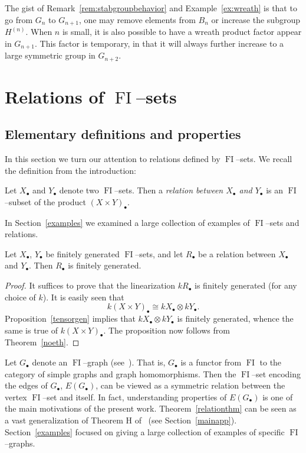 \documentclass[ALCO,ThmDefs,Unicode,epreuves]{cedram}
\DeclareMathOperator{\FI}{FI}
\newcommand{\dt}{\bullet}
\begin{document}
The gist of Remark~\ref{rem:stabgroupbehavior} and Example~\ref{ex:wreath} is that to go from $G_n$ to $G_{n+1}$, one may remove elements from $B_n$ or increase the subgroup $H^{(n)}$. When $n$ is small, it is also possible to have a wreath product factor appear in $G_{n+1}$. This factor is temporary, in that it will always further increase to a large symmetric group in $G_{n+2}$.

\section{Relations of \texorpdfstring{$\FI$}{FI}--sets}

\subsection{Elementary definitions and properties}

In this section we turn our attention to relations defined by $\FI$--sets. We recall the definition from the introduction:

\begin{definition}
Let $X_\dt$ and $Y_\dt$ denote two $\FI$--sets. Then a \emph{relation between $X_\dt$ and $Y_\dt$} is an $\FI$--subset of the product $(X \times Y)_\dt$. 
\end{definition}

In Section~\ref{examples} we examined a large collection of examples of $\FI$--sets and relations.

\begin{proposition}
Let $X_\dt$, $Y_\dt$ be finitely generated $\FI$--sets, and let $R_\dt$ be a relation between $X_\dt$ and $Y_\dt$. Then $R_\dt$ is finitely generated.
\end{proposition}

\begin{proof}
It suffices to prove that the linearization $k R_\dt$ is finitely generated (for any choice of $k$). It is easily seen that
\[
k(X \times Y)_\dt \cong kX_\dt \otimes kY_\dt.
\]
Proposition~\ref{tensorgen} implies that $kX_\dt \otimes kY_\dt$ is finitely generated, whence the same is true of $k(X\times Y)_\dt$. The proposition now follows from Theorem~\ref{noeth}.
\end{proof}

\begin{example}
Let $G_\dt$ denote an $\FI$--graph (see~\cite{RW}). That is, $G_\dt$ is a functor from $\FI$ to the category of simple graphs and graph homomorphisms. Then the $\FI$--set encoding the edges of $G_\dt$, $E(G_\dt)$, can be viewed as a symmetric relation between the vertex $\FI$--set and itself. In fact, understanding properties of $E(G_\dt)$ is one of the main motivations of the present work. Theorem~\ref{relationthm} can be seen as a vast generalization of Theorem H of~\cite{RW} (see Section~\ref{mainapp}). Section~\ref{examples} focused on giving a large collection of examples of specific $\FI$--graphs.
\end{example}
\end{document}
